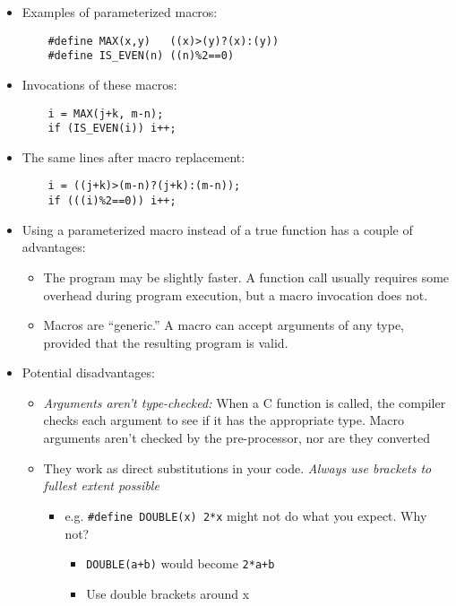 \documentclass{article}
\begin{document}
\begin{itemize}
\item Examples of parameterized macros:
\begin{verbatim}
	#define MAX(x,y)   ((x)>(y)?(x):(y))
	#define IS_EVEN(n) ((n)%2==0)
\end{verbatim}

\item Invocations of these macros:
\begin{verbatim}
	i = MAX(j+k, m-n);
	if (IS_EVEN(i)) i++;
\end{verbatim}

\item The same lines after macro replacement:
\begin{verbatim}
	i = ((j+k)>(m-n)?(j+k):(m-n));
	if (((i)%2==0)) i++;
\end{verbatim}
\end{itemize}




\begin{itemize}
\item Using a parameterized macro instead of a true function has a couple of advantages:

\begin{itemize}
\item The program may be slightly faster. A function call usually requires some overhead during program execution, but a macro invocation does not.
\item Macros are ``generic.'' A macro can accept arguments of any type, provided that the resulting program is valid.
\end{itemize}
\end{itemize}

\begin{itemize}
\item Potential disadvantages:
\begin{itemize}
\item \emph{Arguments aren't type-checked:}
When a C function is called, the compiler checks each argument to see if it has the appropriate type. Macro arguments aren't checked by the pre-processor, nor are they converted
\item They work as direct substitutions in your code. \emph{Always use brackets to fullest extent possible}
\begin{itemize}
\item e.g. \verb!#define DOUBLE(x) 2*x!  might not do what you expect. Why not?
\begin{itemize}
	\item \texttt{DOUBLE(a+b)} would become \texttt{2*a+b}
	\item Use double brackets around x
\end{itemize}
\end{itemize}
\end{itemize}
\end{itemize}
\end{document}
